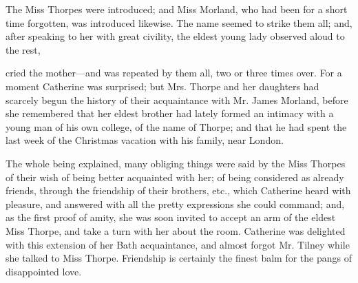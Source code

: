 The Miss Thorpes were introduced; and Miss Morland, who had been for a short time forgotten, was introduced likewise. The name seemed to strike them all; and, after speaking to her with great civility, the eldest young lady observed aloud to the rest, 

 cried the mother---and  was repeated by them all, two or three times over. For a moment Catherine was surprised; but Mrs. Thorpe and her daughters had scarcely begun the history of their acquaintance with Mr. James Morland, before she remembered that her eldest brother had lately formed an intimacy with a young man of his own college, of the name of Thorpe; and that he had spent the last week of the Christmas vacation with his family, near London.

The whole being explained, many obliging things were said by the Miss Thorpes of their wish of being better acquainted with her; of being considered as already friends, through the friendship of their brothers, etc., which Catherine heard with pleasure, and answered with all the pretty expressions she could command; and, as the first proof of amity, she was soon invited to accept an arm of the eldest Miss Thorpe, and take a turn with her about the room. Catherine was delighted with this extension of her Bath acquaintance, and almost forgot Mr. Tilney while she talked to Miss Thorpe. Friendship is certainly the finest balm for the pangs of disappointed love.

